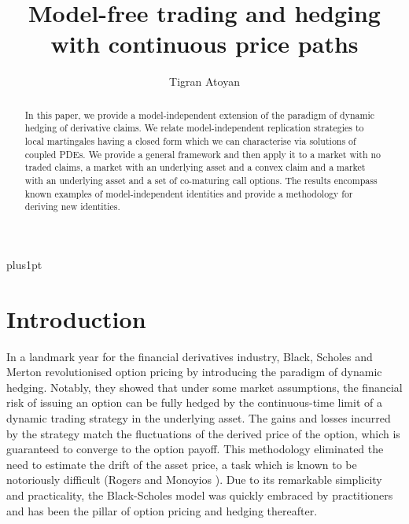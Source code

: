 \documentclass[11pt]{article}
\title{Model-free trading and hedging with continuous price paths}
\author{Tigran Atoyan}
\begin{document}
\baselineskip=18pt plus1pt

\setcounter{secnumdepth}{3}
\setcounter{tocdepth}{3}

\maketitle

\begin{abstract}
In this paper, we provide a model-independent extension of the paradigm of dynamic hedging of derivative claims. We relate model-independent replication strategies to local martingales having a closed form which we can characterise via solutions of coupled PDEs. We provide a general framework and then apply it to a market with no traded claims, a market with an underlying asset and a convex claim and a market with an underlying asset and a set of co-maturing call options. The results encompass known examples of model-independent identities and provide a methodology for deriving new identities.
\end{abstract}

\section{Introduction}
\label{section: introduction}

In a landmark year for the financial derivatives industry, Black, Scholes and Merton \cite{Black-Scholes, Merton} revolutionised option pricing by introducing the paradigm of dynamic hedging. Notably, they showed that under some market assumptions, the financial risk of issuing an option can be fully hedged by the continuous-time limit of a dynamic trading strategy in the underlying asset. The gains and losses incurred by the strategy match the fluctuations of the derived price of the option, which is guaranteed to converge to the option payoff. This methodology eliminated the need to estimate the drift of the asset price, a task which is known to be notoriously difficult (Rogers \cite{Rogers} and Monoyios \cite{Monoyios}). Due to its remarkable simplicity and practicality,  the Black-Scholes model was quickly embraced by practitioners and has been the pillar of option pricing and hedging thereafter. 
\end{document}
